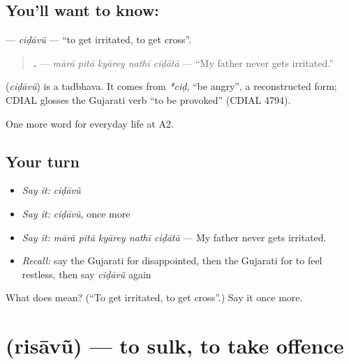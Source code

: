 \subsection*{You'll want to know: }
\textbf{} — \emph{ciḍāvũ} — \textquotedblleft{}to get irritated, to get cross\textquotedblright{}.

\begin{quote}
\textbf{    .} — \emph{mārā pitā kyārey nathī ciḍātā} — \textquotedblleft{}My father never gets irritated.\textquotedblright{}
\end{quote}

\begin{cousinweb}
\textbf{} (\emph{ciḍāvũ}) is a tadbhava. It comes from \emph{*ciḍ}, \textquotedblleft{}be angry\textquotedblright{}, a reconstructed form; CDIAL glosses the Gujarati verb \textquotedblleft{}to be provoked\textquotedblright{} (CDIAL 4794).
\end{cousinweb}

\begin{grammarlens}[title={What you've built}]
One more word for everyday life at A2.
\end{grammarlens}

\subsection*{Your turn}
\begin{itemize}
\raggedright
  \item \emph{Say it:} \emph{ciḍāvũ}
  \item \emph{Say it:} \emph{ciḍāvũ}, once more
  \item \emph{Say it:} \emph{mārā pitā kyārey nathī ciḍātā} — My father never gets irritated.
  \item \emph{Recall:} say the Gujarati for disappointed, then the Gujarati for to feel restless, then say \emph{ciḍāvũ} again
\end{itemize}

\begin{tcolorbox}[breakable,colback=teal!4,colframe=teal!35!black,title={Before you move on}]
What does  mean? (\textquotedblleft{}To get irritated, to get cross\textquotedblright{}.) Say it once more.
\end{tcolorbox}
\section[\texorpdfstring{\gu{રિસાવું} (risāvũ)}{રિસાવું (risāvũ)}]{ (risāvũ) — to sulk, to take offence}

